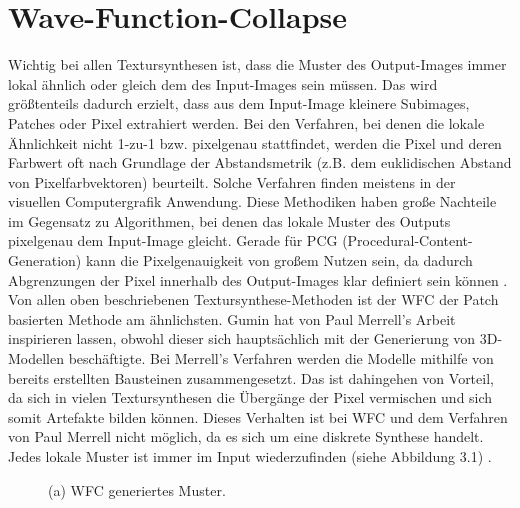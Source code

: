 \documentclass[12pt, a4paper,twoside,openright]{report} %
\begin{document}
\chapter{Wave-Function-Collapse}

Wichtig bei allen Textursynthesen ist,
dass die Muster des Output-Images immer lokal ähnlich oder gleich dem des Input-Images sein müssen.
Das wird größtenteils dadurch erzielt, dass aus dem Input-Image kleinere Subimages, Patches oder Pixel extrahiert werden.
Bei den Verfahren, bei denen die lokale Ähnlichkeit nicht 1-zu-1 bzw. pixelgenau stattfindet,
werden die Pixel und deren Farbwert oft nach Grundlage der Abstandsmetrik {(z.B. dem euklidischen Abstand von Pixelfarbvektoren)} beurteilt.
Solche Verfahren finden meistens in der visuellen Computergrafik Anwendung.
Diese Methodiken haben große Nachteile im Gegensatz zu Algorithmen, bei denen das lokale Muster des Outputs pixelgenau dem Input-Image gleicht.
Gerade für PCG {(Procedural-Content-Generation)} kann die Pixelgenauigkeit von großem Nutzen sein, da dadurch Abgrenzungen der Pixel innerhalb des Output-Images klar definiert sein können 
\cite{Karth2017WaveFunctionCollapseIC}.
Von allen oben beschriebenen Textursynthese-Methoden ist der WFC der Patch basierten Methode am ähnlichsten.
\newline
Gumin hat von Paul Merrell's Arbeit inspirieren lassen, obwohl dieser sich hauptsächlich mit der Generierung von 3D-Modellen beschäftigte.
Bei Merrell's Verfahren werden die Modelle mithilfe von bereits erstellten Bausteinen zusammengesetzt.
Das ist dahingehen von Vorteil, da sich in vielen Textursynthesen die Übergänge der Pixel vermischen und sich somit Artefakte bilden können.
Dieses Verhalten ist bei WFC und dem Verfahren von Paul Merrell nicht möglich, da es sich um eine diskrete Synthese handelt.
Jedes lokale Muster ist immer im Input wiederzufinden {(siehe Abbildung 3.1)} \cite{Karth2017WaveFunctionCollapseIC, merrell2009model, Gumin_Wave_Function_Collapse_2016}.

\begin{figure}[H]
    \centering
    \caption{(a) WFC generiertes Muster.}%
\end{figure}
\end{document}
